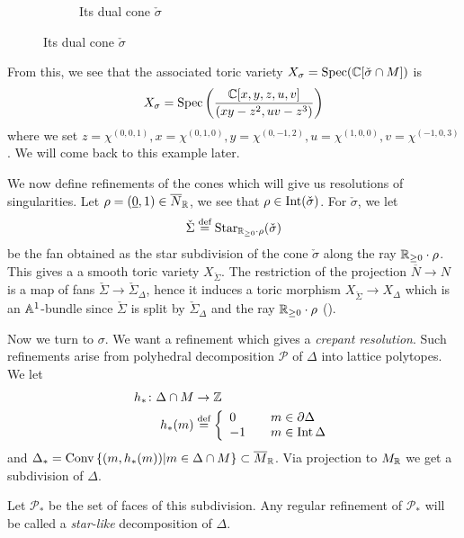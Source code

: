 \documentclass[../main.tex]{subfiles}
\begin{document}
\begin{es}
\begin{figure}[ht]
\begin{subfigure}[b]{0.4\textwidth}
 \caption{Its dual cone $\check{\sigma}$}
    \label{checksigma}
  \end{subfigure}
\end{figure}


From this, we see that the associated toric variety $X_\sigma= \Spec (\CC[ \check{\sigma} \cap M ] )$ is
\[
X_\sigma = \Spec \left( \frac{\CC[x,y,z,u,v]}{ (xy-z^2,uv-z^3 ) } \right)
\]
where we set $z = \chi^{(0,0,1)}, x = \chi^{(0,1,0)}, y = \chi^{(0,-1,2)}, u=\chi^{(1,0,0)}, v=\chi^{(-1,0,3)}$. 
We will come back to this example later.
\end{es}

We now define refinements of the cones which will give us resolutions of singularities.
Let $\rho= (\underline{0},1) \in \overline{N}_\RR$, we see that $\rho \in \Int (\check{\sigma})$. For $\check{\sigma}$, we let
\begin{align*}
    \check{\Sigma} \defeq \Star_{\RR_{\geq0} \cdot \rho} (\check{\sigma})
\end{align*}
be the fan obtained as the star subdivision of the cone $\check{\sigma}$ along the ray $\RR_{\geq0} \cdot \rho$.
This gives a a smooth toric variety $X_{\check{\Sigma}}$.
The restriction of the projection $\overline{N} \to N$ is a map of fans $\check{\Sigma} \to \check{\Sigma}_\Delta$, hence it induces a toric morphism $X_{\check{\Sigma}} \to X_\Delta$ which is an $\AA^1$-bundle since $\check{\Sigma}$ is split by $\check{\Sigma}_\Delta$ and the ray $\RR_{\geq0} \cdot \rho$ (\cite[def. 3.3.18]{CLS11}).

Now we turn to $\sigma$. We want a refinement which gives a \emph{crepant resolution}. Such refinements arise from polyhedral decomposition $\mathscr{P}$ of $\Delta$ into lattice polytopes.
We let 
\begin{align*}
    h_* \colon \Delta \cap M &\to \ZZ \\
    h_*(m) &\defeq    \left\{\begin{array}{ll} 
 0 &\quad m \in \partial\Delta \\ 
-1 &\quad m \in \Int \Delta \\ 
\end{array}\right.
\end{align*}
and $\Delta_* = \Conv \left\{ (m,h_*(m)) | m \in \Delta \cap M \right\} \subset \overline{M}_\RR $.
Via projection to $M_\RR$ we get a subdivision of $\Delta$.

Let $\mathscr{P}_*$ be the set of faces of this subdivision. Any regular refinement of $\mathscr{P}_*$ will be called a \emph{star-like} decomposition of $\Delta$.
\end{document}
